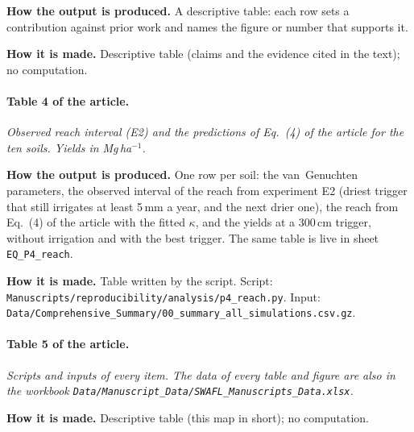 \textbf{How the output is produced.} A descriptive table: each row sets a contribution against prior work and names the figure or number that supports it.

\textbf{How it is made.} Descriptive table (claims and the evidence cited in the text); no computation.

\paragraph{Table 4 of the article.} \emph{Observed reach interval (E2) and the predictions of Eq.~(4) of the article for the ten soils. Yields in Mg\,ha$^{-1}$.}

\textbf{How the output is produced.} One row per soil: the van~Genuchten parameters, the observed interval of the reach from experiment E2 (driest trigger that still irrigates at least 5\,mm a year, and the next drier one), the reach from Eq.~(4) of the article with the fitted $\kappa$, and the yields at a 300\,cm trigger, without irrigation and with the best trigger. The same table is live in sheet \texttt{EQ\_P4\_reach}.

\textbf{How it is made.} Table written by the script. Script: \nolinkurl{Manuscripts/reproducibility/analysis/p4_reach.py}. Input: \nolinkurl{Data/Comprehensive_Summary/00_summary_all_simulations.csv.gz}.

\paragraph{Table 5 of the article.} \emph{Scripts and inputs of every item. The data of every table and figure are also in the workbook \nolinkurl{Data/Manuscript_Data/SWAFL_Manuscripts_Data.xlsx}.}

\textbf{How it is made.} Descriptive table (this map in short); no computation.
